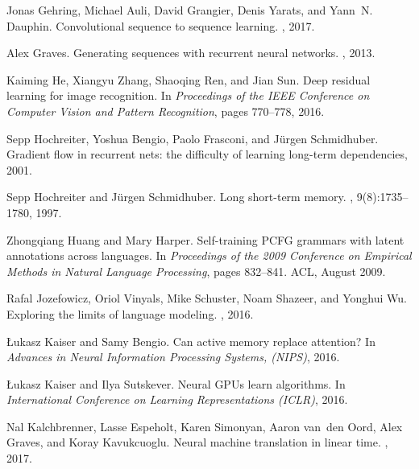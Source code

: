 \documentclass{article}
\begin{document}
\begin{thebibliography}{10}
  Jonas Gehring, Michael Auli, David Grangier, Denis Yarats, and Yann~N.
  Dauphin.
  \newblock Convolutional sequence to sequence learning.
  , 2017.

  Alex Graves.
  \newblock Generating sequences with recurrent neural networks.
  , 2013.

  Kaiming He, Xiangyu Zhang, Shaoqing Ren, and Jian Sun.
  \newblock Deep residual learning for image recognition.
  \newblock In {\em Proceedings of the IEEE Conference on Computer Vision and
      Pattern Recognition}, pages 770--778, 2016.

  Sepp Hochreiter, Yoshua Bengio, Paolo Frasconi, and J{\"u}rgen Schmidhuber.
  \newblock Gradient flow in recurrent nets: the difficulty of learning
  long-term
  dependencies, 2001.

  Sepp Hochreiter and J{\"u}rgen Schmidhuber.
  \newblock Long short-term memory.
  , 9(8):1735--1780, 1997.

  Zhongqiang Huang and Mary Harper.
  \newblock Self-training {PCFG} grammars with latent annotations across
  languages.
  \newblock In {\em Proceedings of the 2009 Conference on Empirical Methods in
      Natural Language Processing}, pages 832--841. ACL, August 2009.

  Rafal Jozefowicz, Oriol Vinyals, Mike Schuster, Noam Shazeer, and Yonghui Wu.
  \newblock Exploring the limits of language modeling.
  , 2016.

  {\L}ukasz Kaiser and Samy Bengio.
  \newblock Can active memory replace attention?
  \newblock In {\em Advances in Neural Information Processing Systems,
      ({NIPS})},
  2016.

  \L{}ukasz Kaiser and Ilya Sutskever.
  \newblock Neural {GPU}s learn algorithms.
  \newblock In {\em International Conference on Learning Representations
      ({ICLR})}, 2016.

  Nal Kalchbrenner, Lasse Espeholt, Karen Simonyan, Aaron van~den Oord, Alex
  Graves, and Koray Kavukcuoglu.
  \newblock Neural machine translation in linear time.
  , 2017.


\end{thebibliography}
\end{document}
